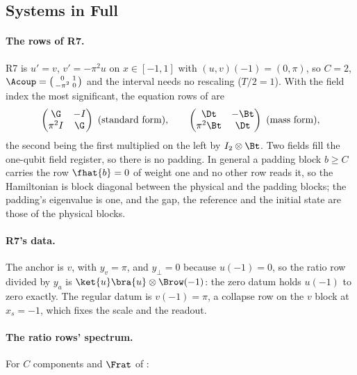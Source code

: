 \subsection{Systems in Full}
\label{app:systems}

\paragraph{The rows of R7.} R7 is $u'=v$, $v'=-\pi^2u$ on $x\in[-1,1]$ with $(u,v)(-1)=(0,\pi)$, so $C=2$, $\Acoup=\bigl(\begin{smallmatrix}0&1\\-\pi^2&0\end{smallmatrix}\bigr)$ and the interval needs no rescaling ($T/2=1$). With the field index the most significant, the equation rows of  are
\begin{equation}
    \begin{pmatrix}\G & -I\\ \pi^2 I & \G\end{pmatrix}\ \text{(standard form)},
    \qquad
    \begin{pmatrix}\Dt & -\Bt\\ \pi^2\Bt & \Dt\end{pmatrix}\ \text{(mass form)},
\end{equation}
the second being the first multiplied on the left by $I_2\otimes\Bt$. Two fields fill the one-qubit field register, so there is no padding. In general a padding block $b\ge C$ carries the row $\fhat{b}=0$ of weight one and no other row reads it, so the Hamiltonian is block diagonal between the physical and the padding blocks; the padding's eigenvalue is one, and the gap, the reference and the initial state are those of the physical blocks.

\paragraph{R7's data.} The anchor is $v$, with $y_v=\pi$, and $y_\perp=0$ because $u(-1)=0$, so the ratio row divided by $y_a$ is $\ket{u}\bra{u}\otimes\Brow(-1)$: the zero datum holds $u(-1)$ to zero exactly. The regular datum is $v(-1)=\pi$, a collapse row on the $v$ block at $x_s=-1$, which fixes the scale and the readout.

\paragraph{The ratio rows' spectrum.} For $C$ components and $\Frat$ of :

